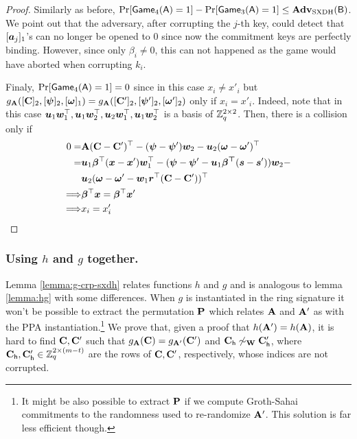 \begin{proof}
Similarly as before, $\Pr[\mathsf{Game}_4(\mathsf{A})=1]-\Pr[\mathsf{Game}_3(\mathsf{A})=1]\leq\mathbf{Adv}_\mathrm{SXDH}(\mathsf{B})$. We point out that the adversary, after corrupting the $j$-th key, could detect that $[{\boldsymbol{a}}_j]_1$'s  can no longer be opened to 0 since now the commitment keys are perfectly binding. However, since only $\beta_i\neq 0$, this can not happened as the game would have aborted when corrupting $k_i$.

Finaly, $\Pr[\mathsf{Game}_4(\mathsf{A})=1]=0$ since in this case $x_i \neq x'_i$ but $g_{\mathbf{{A}}}([\mathbf{{C}}]_2,[{\boldsymbol{\psi}}]_2,\allowbreak[{\boldsymbol{\omega}}]_1)=g_{\mathbf{{A}}}([\mathbf{{C}}']_2,[{\boldsymbol{\psi}}']_2,[{\boldsymbol{\omega}}']_2)$  only if $x_i = x'_i$. Indeed, note that in this case ${\boldsymbol{u}}_1{\boldsymbol{w}}_1^\top,{\boldsymbol{u}}_1{\boldsymbol{w}}_2^\top,\allowbreak{\boldsymbol{u}}_2{\boldsymbol{w}}_1^\top,{\boldsymbol{u}}_1{\boldsymbol{w}}_2^\top$ is a basis of $\mathbb{Z}_q^{2\times 2}$. Then, there is a collision only if
\begin{align*}
0=&\matr{A}(\matr{C}-\matr{C}')^\top - (\vec{\psi}-\vecb{\psi}')\vecb{w}_2 - \vecb{u}_2(\vecb{\omega}-\vecb{\omega}')^\top\\
=&\vecb{u}_1\vecb{\beta}^\top(\vecb{x}-\vecb{x}')\vecb{w}_1^\top - (\vec{\psi}-\vecb{\psi}'-\vecb{u}_1\vecb{\beta^\top}(\vecb{s}-\vecb{s}'))\vecb{w}_2 - \\
&\vecb{u}_2(\vecb{\omega}-\vecb{\omega}'-\vecb{w}_1\vecb{r}^\top(\matr{C}-\matr{C}'))^\top\\
\Longrightarrow & \vecb{\beta}^\top\vecb{x}=\vecb{\beta}^\top\vecb{x}' \\
\Longrightarrow  &x_i  = x'_i\\
\end{align*}
\end{proof}

\subsubsection{Using $h$ and $g$ together.}
Lemma \ref{lemma:g-crp-sxdh} relates functions $h$ and $g$ and is analogous to lemma \ref{lemma:hg} with some differences. When $g$ is instantiated in the ring signature it won't be possible to extract the permutation $\mathbf{{P}}$ which relates $\mathbf{{A}}$ and $\mathbf{{A}}'$ as with the PPA instantiation.\footnote{It might be also possible to extract $\mathbf{{P}}$ if we compute Groth-Sahai commitments to the randomness used to re-randomize $\mathbf{{A}}'$. This solution is far less efficient though.}
We prove that, given a proof that $h(\mathbf{{A}}')=h(\mathbf{{A}})$, it is hard to find $\mathbf{{C}},\mathbf{{C}}'$ such that $g_{\mathbf{{A}}}(\mathbf{{C}})=g_{\mathbf{{A'}}}(\mathbf{{C}}')$ and $\mathbf{{C}}_\mathsf{h}\not\sim_{\mathbf{{W}}}\mathbf{{C}}'_\mathsf{h}$, where $\mathbf{{C}}_\mathsf{h},\mathbf{{C}}'_\mathsf{h}\in\mathbb{Z}_q^{2\times(m-t)}$ are the rows of $\mathbf{{C}}, \mathbf{{C}}'$, respectively, whose indices are not corrupted.

